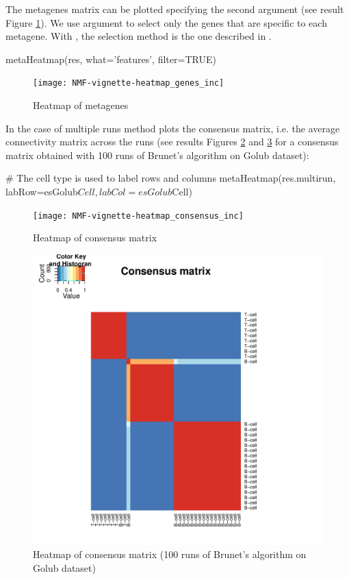 \documentclass[a4paper]{article}
\begin{document}
The metagenes matrix can be plotted specifying the second argument
 (see result Figure \ref{fig:heatmap_genes}). 
We use argument  to select only the genes that are specific to 
each metagene. 
With , the selection method is the one described in \cite{Kim2007}.
\begin{Schunk}
\begin{Sinput}
 metaHeatmap(res, what='features', filter=TRUE)
\end{Sinput}
\end{Schunk}

\begin{figure}[ht]
\centering
\texttt{[image: NMF-vignette-heatmap\_genes\_inc]}
\caption{Heatmap of metagenes}
\label{fig:heatmap_genes}
\end{figure}


In the case of multiple runs method  plots the consensus
matrix, i.e. the average connectivity matrix across the runs (see results
Figures \ref{fig:heatmap_consensus} and \ref{fig:heatmap_consensus_precomp}
for a consensus matrix obtained with 100 runs of Brunet's algorithm on Golub
dataset):
\begin{Schunk}
\begin{Sinput}
 # The cell type is used to label rows and columns 
 metaHeatmap(res.multirun, labRow=esGolub$Cell, labCol=esGolub$Cell)
\end{Sinput}
\end{Schunk}


\begin{figure}[ht]
\centering
\texttt{[image: NMF-vignette-heatmap\_consensus\_inc]}
\caption{Heatmap of consensus matrix}
\label{fig:heatmap_consensus}
\end{figure}
    
\begin{figure}[ht]
\centering
\includegraphics{consensus}
\caption{Heatmap of consensus matrix (100 runs of Brunet's algorithm on Golub
dataset)}
\label{fig:heatmap_consensus_precomp}
\end{figure}
\end{document}
